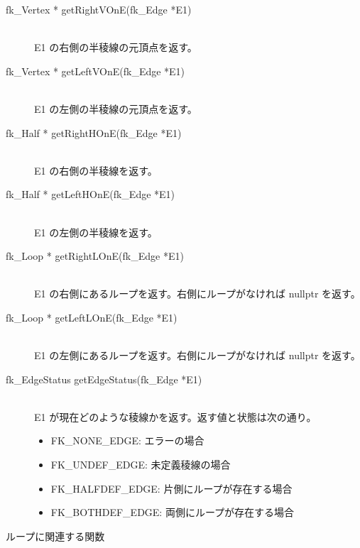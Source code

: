 \begin{description}
 \item[\hspace*{0.6cm}fk\_Vertex * getRightVOnE(fk\_Edge *E1)] ~ \\
	E1 の右側の半稜線の元頂点を返す。

 \item[\hspace*{0.6cm}fk\_Vertex * getLeftVOnE(fk\_Edge *E1)] ~ \\
	E1 の左側の半稜線の元頂点を返す。

 \item[\hspace*{0.6cm}fk\_Half * getRightHOnE(fk\_Edge *E1)] ~ \\
	E1 の右側の半稜線を返す。

 \item[\hspace*{0.6cm}fk\_Half * getLeftHOnE(fk\_Edge *E1)] ~ \\
	E1 の左側の半稜線を返す。

 \item[\hspace*{0.6cm}fk\_Loop * getRightLOnE(fk\_Edge *E1)] ~ \\
	E1 の右側にあるループを返す。右側にループがなければ
	nullptr を返す。

 \item[\hspace*{0.6cm}fk\_Loop * getLeftLOnE(fk\_Edge *E1)] ~ \\
	E1 の左側にあるループを返す。右側にループがなければ
	nullptr を返す。

 \item[\hspace*{0.6cm}fk\_EdgeStatus getEdgeStatus(fk\_Edge *E1)] ~ \\
	E1 が現在どのような稜線かを返す。返す値と状態は次の通り。
	\begin{itemize}
	 \item FK\_NONE\_EDGE: エラーの場合
	 \item FK\_UNDEF\_EDGE: 未定義稜線の場合
	 \item FK\_HALFDEF\_EDGE: 片側にループが存在する場合
	 \item FK\_BOTHDEF\_EDGE: 両側にループが存在する場合
	\end{itemize}
\end{description}
\begin{center}
{\large ループに関連する関数}
\end{center}
